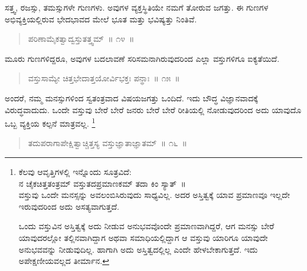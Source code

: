 
\vspace{0.1cm}

ಸತ್ತ್ವ, ರಜಸ್ಸು, ತಮಸ್ಸುಗಳೇ ಗುಣಗಳು. ಅವುಗಳ ವ್ಯಕ್ತಸ್ಥಿತಿಯೇ ನಮಗೆ ತೋರುವ ಜಗತ್ತು. ಈ ಗುಣಗಳ ಅಭಿವ್ಯಕ್ತಿಯಲ್ಲಿರುವ ಭೇದಭಾವದ ಮೇಲೆ ಭೂತ ಮತ್ತು ಭವಿಷ್ಯತ್ತು ನಿಂತಿವೆ. 

\newpage 

\begin{verse}
ಪರಿಣಾಮೈಕತ್ವಾದ್ವಸ್ತುತತ್ತ್ವಮ್​~॥ ೧೪~॥
\end{verse}

\vspace{-0.5cm}


\vspace{0.2cm}

ಮೂರು ಗುಣಗಳಿದ್ದರೂ, ಅವುಗಳ ಬದಲಾವಣೆ ಸರಿಸಮನಾಗಿರುವುದರಿಂದ ಎಲ್ಲಾ ವಸ್ತುಗಳಿಗೂ ಐಕ್ಯತೆಯಿದೆ. 


\begin{verse}
ವಸ್ತುಸಾಮ್ಯೇ ಚಿತ್ತಭೇದಾತ್ತಯೋರ್ವಿಭಕ್ತಃ ಪನ್ಥಾಃ~॥ ೧೫~॥
\end{verse}

\vspace{-0.5cm}


\vspace{0.2cm}

ಅಂದರೆ, ನಮ್ಮ ಮನಸ್ಸುಗಳಿಂದ ಸ್ವತಂತ್ರವಾದ ವಿಷಯಜಗತ್ತು ಒಂದಿದೆ. ಇದು ಬೌದ್ಧ ವಿಜ್ಞಾನವಾದಕ್ಕೆ ವಿರುದ್ಧವಾದುದು. ಒಂದೇ ವಸ್ತುವು ಬೇರೆ ಬೇರೆ ಜನರು ಬೇರೆ ಬೇರೆ ರೀತಿಯಲ್ಲಿ ನೋಡುವುದರಿಂದ ಅದು ಯಾವುದೊ ಒಬ್ಬ ವ್ಯಕ್ತಿಯ ಕಲ್ಪನೆ ಮಾತ್ರವಲ್ಲ. \footnote{ಕೆಲವು ಆವೃತ್ತಿಗಳಲ್ಲಿ ಇನ್ನೊಂದು ಸೂತ್ರವಿದೆ:\\ನ ಚೈಕಚಿತ್ತತಂತ್ರಮ್​ ವಸ್ತುತದಪ್ರಮಾಣಕಮ್​ ತದಾ ಕಿಂ ಸ್ಯಾತ್​~॥\\ವಸ್ತುವು ಒಂದೇ ಮನಸ್ಸನ್ನು ಅವಲಂಬಿಸಿರುವುದು ಸಾಧ್ಯವಿಲ್ಲ. ಅದರ ಅಸ್ತಿತ್ವಕ್ಕೆ ಯಾವ ಪ್ರಮಾಣವೂ ಇಲ್ಲದೇ ಇರುವುದರಿಂದ ಅದು ಅಸತ್ಯವಾಗುತ್ತದೆ.

ಒಂದು ವಸ್ತುವಿನ ಅಸ್ತಿತ್ವಕ್ಕೆ ಅದು ನೀಡುವ ಅನುಭವವೊಂದೇ ಪ್ರಮಾಣವಾಗಿದ್ದರೆ, ಆಗ ಮನಸ್ಸು ಬೇರೆ ಯಾವುದರಲ್ಲೋ ತಲ್ಲಿನವಾಗಿದ್ದಾಗ ಅಥವಾ ಸಮಾಧಿಯಲ್ಲಿದ್ದಾಗ ಆ ವಸ್ತುವು ಯಾರಿಗೂ ಯಾವುದೇ ಅನುಭವವನ್ನು ನೀಡುವುದಿಲ್ಲ. ಹಾಗಾಗಿ ಅದು ಅಸ್ತಿತ್ವದಲ್ಲಿಲ್ಲ ಎಂದೇ ಹೇಳಬೇಕಾಗುತ್ತದೆ. ಇದು ಅಪೇಕ್ಷಣೀಯವಲ್ಲದ ತೀರ್ಮಾನ.}

\vspace{-0.2cm}

\begin{verse}
ತದುಪರಾಗಾಪೇಕ್ಷಿತ್ವಾಚ್ಚಿತ್ತಸ್ಯ ವಸ್ತುಜ್ಞಾತಾಜ್ಞಾತಮ್​~॥ ೧೬~॥
\end{verse}

